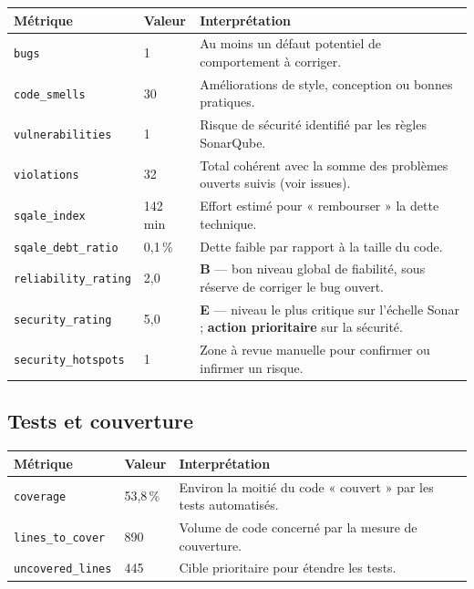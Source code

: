 \documentclass[11pt,a4paper]{article}
\begin{document}
\begin{table}[h]
  \centering
  \begin{tabular}{@{}llp{6.5cm}@{}}
    \toprule
    \textbf{Métrique} & \textbf{Valeur} & \textbf{Interprétation} \\
    \midrule
    \texttt{bugs} & 1 & Au moins un défaut potentiel de comportement à corriger. \\
    \texttt{code\_smells} & 30 & Améliorations de style, conception ou bonnes pratiques. \\
    \texttt{vulnerabilities} & 1 & Risque de sécurité identifié par les règles SonarQube. \\
    \texttt{violations} & 32 & Total cohérent avec la somme des problèmes ouverts suivis (voir issues). \\
    \texttt{sqale\_index} & 142 min & Effort estimé pour « rembourser » la dette technique. \\
    \texttt{sqale\_debt\_ratio} & 0,1\,\% & Dette faible par rapport à la taille du code. \\
    \texttt{reliability\_rating} & 2,0 & \textbf{B} --- bon niveau global de fiabilité, sous réserve de corriger le bug ouvert. \\
    \texttt{security\_rating} & 5,0 & \textbf{E} --- niveau le plus critique sur l'échelle Sonar ; \textbf{action prioritaire} sur la sécurité. \\
    \texttt{security\_hotspots} & 1 & Zone à revue manuelle pour confirmer ou infirmer un risque. \\
    \bottomrule
  \end{tabular}
\end{table}

\subsection{Tests et couverture}

\begin{table}[h]
  \centering
  \begin{tabular}{@{}llp{7cm}@{}}
    \toprule
    \textbf{Métrique} & \textbf{Valeur} & \textbf{Interprétation} \\
    \midrule
    \texttt{coverage} & 53,8\,\% & Environ la moitié du code « couvert » par les tests automatisés. \\
    \texttt{lines\_to\_cover} & 890 & Volume de code concerné par la mesure de couverture. \\
    \texttt{uncovered\_lines} & 445 & Cible prioritaire pour étendre les tests. \\
    \bottomrule
  \end{tabular}
\end{table}
\end{document}

